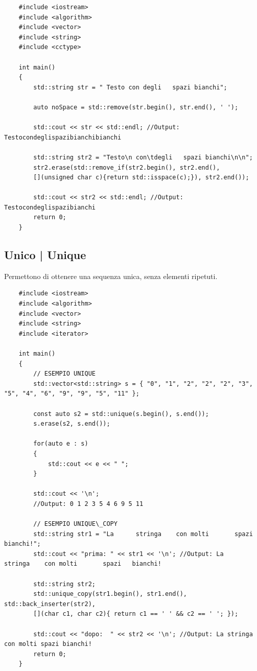 \begin{lstlisting}
	#include <iostream>
	#include <algorithm>
	#include <vector>
	#include <string>
	#include <cctype>
	
	int main()
	{
		std::string str = " Testo con degli   spazi bianchi";
		
		auto noSpace = std::remove(str.begin(), str.end(), ' ');
		
		std::cout << str << std::endl; //Output: Testocondeglispazibianchibianchi
		
		std::string str2 = "Testo\n con\tdegli   spazi bianchi\n\n";
		str2.erase(std::remove_if(str2.begin(), str2.end(), 
		[](unsigned char c){return std::isspace(c);}), str2.end());
		
		std::cout << str2 << std::endl; //Output: Testocondeglispazibianchi
		return 0;
	}
\end{lstlisting}

\subsection{Unico | Unique}

\textsf{\small Permettono di ottenere una sequenza unica, senza elementi ripetuti.} \\

\begin{lstlisting}
	#include <iostream>
	#include <algorithm>
	#include <vector>
	#include <string>
	#include <iterator>
	
	int main()
	{
		// ESEMPIO UNIQUE
		std::vector<std::string> s = { "0", "1", "2", "2", "2", "3", "5", "4", "6", "9", "9", "5", "11" };
		
		const auto s2 = std::unique(s.begin(), s.end());
		s.erase(s2, s.end());
		
		for(auto e : s)
		{
			std::cout << e << " ";
		}
		
		std::cout << '\n';
		//Output: 0 1 2 3 5 4 6 9 5 11
		
		// ESEMPIO UNIQUE\_COPY
		std::string str1 = "La      stringa    con molti       spazi   bianchi!";
		std::cout << "prima: " << str1 << '\n'; //Output: La      stringa    con molti       spazi   bianchi!
		
		std::string str2;
		std::unique_copy(str1.begin(), str1.end(), std::back_inserter(str2),
		[](char c1, char c2){ return c1 == ' ' && c2 == ' '; });
		
		std::cout << "dopo:  " << str2 << '\n'; //Output: La stringa con molti spazi bianchi!
		return 0;
	}
\end{lstlisting}

